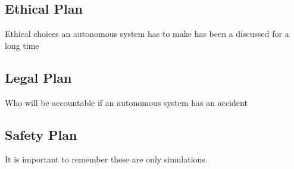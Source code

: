 \subsection{Ethical Plan}
Ethical choices an autonomous system has to make has been a discussed for a long time

\subsection{Legal Plan}
Who will be accountable if an autonomous system has an accident

\subsection{Safety Plan}
It is important to remember these are only simulations. 